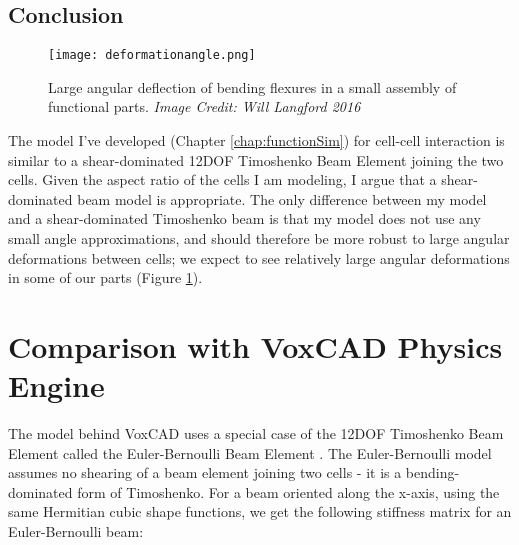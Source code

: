 {%
%

\subsection{Conclusion}

\begin{figure}
  \texttt{[image: deformationangle.png]}
  \caption{Large angular deflection of bending flexures in a small assembly of functional parts. \textit{Image Credit: Will Langford 2016}}
  \label{fig:deformationangle}
\end{figure}

The model I've developed (Chapter \ref{chap:functionSim}) for cell-cell interaction is similar to a shear-dominated 12DOF Timoshenko Beam Element joining the two cells.  Given the aspect ratio of the cells I am modeling, I argue that a shear-dominated beam model is appropriate.  The only difference between my model and a shear-dominated Timoshenko beam is that my model does not use any small angle approximations, and should therefore be more robust to large angular deformations between cells; we expect to see relatively large angular deformations in some of our parts (Figure \ref{fig:deformationangle}).

\section{Comparison with VoxCAD Physics Engine}

The model behind VoxCAD uses a special case of the 12DOF Timoshenko Beam Element called the Euler-Bernoulli Beam Element \cite{Hiller2014a}.  The Euler-Bernoulli model assumes no shearing of a beam element joining two cells - it is a bending-dominated form of Timoshenko.  For a beam oriented along the x-axis, using the same Hermitian cubic shape functions, we get the following stiffness matrix for an Euler-Bernoulli beam:

}
